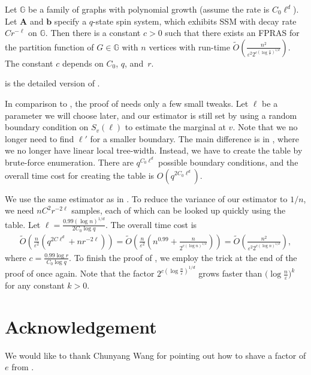 \documentclass{theoretics}
\def\=#1{\mathbb{#1}}
\newcommand{\eps}{\varepsilon}
\begin{document}
\begin{theorem} \label{thm:polylog}
  Let $\=G$ be a family of graphs with polynomial growth (assume the rate is $C_0\ell^d$).
  Let ${\mathbf{A}}$ and ${\mathbf{b}}$ specify a $q$-state spin system, which exhibits SSM with decay rate $Cr^{-\ell}$ on $\=G$.
  Then there is a constant $c>0$ such that there exists an FPRAS for the partition function of $G\in\=G$ with $n$ vertices with run-time $\widetilde{O}\left(\frac{n^2}{\eps^2 2^{c(\log \frac{n}{\eps})^{1/d}}}\right)$.
  The constant $c$ depends on $C_0$, $q$, and~$r$.
\end{theorem}

 is the detailed version of .

In comparison to ,
the proof of  needs only a few small tweaks.
Let $\ell$ be a parameter we will choose later,
and our estimator is still set by using a random boundary condition on $S_v(\ell)$ to estimate the marginal at $v$.
Note that we no longer need to find $\ell'$ for a smaller boundary.
The main difference is in ,
where we no longer have linear local tree-width.
Instead, we have to create the table by brute-force enumeration.
There are $q^{C_0\ell^d}$ possible boundary conditions,
and the overall time cost for creating the table is $O(q^{2C_0\ell^d})$.

We use the same estimator as in .
To reduce the variance of our estimator to $1/n$, we need $nC^2r^{-2\ell}$ samples,
each of which can be looked up quickly using the table.
Let $\ell=\frac{0.99(\log n)^{1/d}}{2C_0\log q}$.
The overall time cost is
\begin{align*}
  \widetilde{O}\left( \frac{n}{\eps^2}\left( q^{2C\ell^d}+ nr^{-2\ell}\right) \right)
  =\widetilde{O}\left( \frac{n}{\eps^2}\left(n^{0.99}+\frac{n}{2^{c(\log n)^{1/d}}}\right) \right)
  =\widetilde{O}\left(\frac{n^2}{\eps^2 2^{c(\log n)^{1/d}}}\right),
\end{align*}
where $c=\frac{0.99\log r}{C_0\log q}$.
To finish the proof of ,
we employ the trick at the end of the proof of  once again.
Note that the factor $2^{c(\log \frac{n}{\eps})^{1/d}}$ grows faster than $\big(\log \frac{n}{\eps}\big)^k$ for any constant $k>0$.

\section*{Acknowledgement}
We would like to thank Chunyang Wang for pointing out how to shave a factor of $e$ from . 
\end{document}
